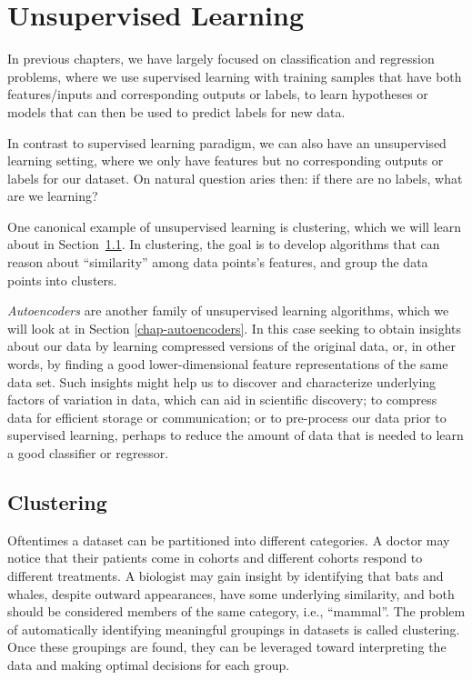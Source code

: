\chapter{Unsupervised Learning}
\label{chap-upsupervised}

In previous chapters, we have largely focused on classification and
regression problems, where we use supervised learning with training
samples that have both features/inputs and corresponding outputs or labels, to
learn hypotheses or models that can then be used to predict labels for
new data.

In contrast to supervised learning paradigm, we can also have an unsupervised learning setting, where we only have features but no
corresponding outputs or labels for our dataset. On natural question aries then: if there are no labels, what are we learning?

One canonical example of unsupervised learning is clustering,
which we will learn about in Section~\ref{chap-clustering}.
In clustering, the goal is to develop algorithms that can reason about
``similarity'' among data points's features, and group the data points
into clusters.

  {\em Autoencoders} are another family of unsupervised learning
algorithms, which we will look at in Section \ref{chap-autoencoders}. In this case seeking to obtain insights about our data by
learning compressed versions of the original data, or, in other words,
by finding a good lower-dimensional feature representations of the
same data set. Such insights might help us to discover and
characterize underlying factors of variation in data, which can aid in
scientific discovery; to compress data for efficient storage or
communication; or to pre-process our data prior to supervised
learning, perhaps to reduce the amount of data that is needed to learn
a good classifier or regressor.


\section{Clustering}
\label{chap-clustering}

Oftentimes a dataset can be partitioned into different categories. A
doctor may notice that their patients come in cohorts and different
cohorts respond to different treatments. A biologist may gain insight
by identifying that bats and whales, despite outward appearances,
have some underlying similarity, and both should be considered members
of the same category, i.e., ``mammal''. The problem of automatically
identifying meaningful groupings in datasets is called
clustering. Once these groupings are found, they can be leveraged
toward interpreting the data and making optimal decisions for each
group.

